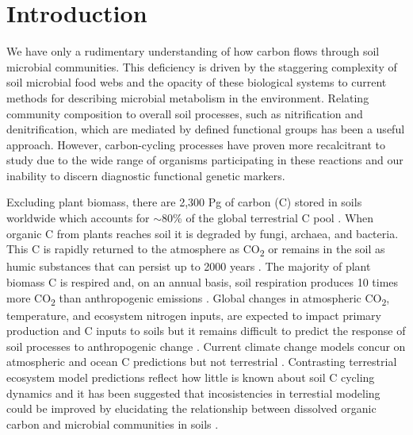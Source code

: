\section{Introduction}
We have only a rudimentary understanding of how carbon flows through soil microbial communities. This deficiency is driven by the staggering complexity of soil microbial food webs and the opacity of these biological systems to current methods for describing microbial metabolism in the environment. Relating community composition to overall soil processes, such as nitrification and denitrification, which are mediated by defined functional groups has been a useful approach. However, carbon-cycling processes have proven more recalcitrant to study due to the wide range of organisms participating in these reactions and our inability to discern diagnostic functional genetic markers.
 
Excluding plant biomass, there are 2,300 Pg of carbon (C) stored in soils worldwide which accounts for $\sim$80\% of the global terrestrial C pool \cite{Amundson_2001,BATJES_1996}. When organic C from plants reaches soil it is degraded by fungi, archaea, and bacteria. This C is rapidly returned to the atmosphere as CO\textsubscript{2} or remains in the soil as humic substances that can persist up to 2000 years \cite{yanagita1990natural}. The majority of plant biomass C is respired and, on an annual basis, soil respiration produces 10 times more CO\textsubscript{2} than anthropogenic emissions \cite{chapin2002principles}. Global changes in atmospheric CO\textsubscript{2}, temperature, and ecosystem nitrogen inputs, are expected to impact primary production and C inputs to soils \cite{Groenigen_2006} but it remains difficult to predict the response of soil processes to anthropogenic change \cite{DAVIDSON_2006}. Current climate change models concur on atmospheric and ocean C predictions but not terrestrial \cite{Friedlingstein_2006}. Contrasting terrestrial ecosystem model predictions reflect how little is known about soil C cycling dynamics and it has been suggested that incosistencies in terrestial modeling could be improved by elucidating the relationship between dissolved organic carbon and microbial communities in soils \cite{Neff_2001}. 

